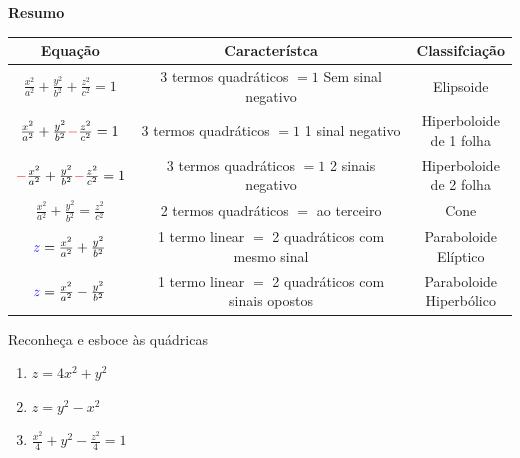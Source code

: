 \begin{center}

\textbf{Resumo}

\begin{tabular}{|c|c|c|}
	\hline
	Equação & Característca  & Classifciação    \\
	\hline
	\(\frac{x^2}{a^2}+\frac{y^2}{b^2}+\frac{z^2}{c^2}=1\) & \makecell{3 termos quadráticos \(=1\) \\ Sem sinal negativo } & Elipsoide \linebreak    \\
	\hline
	\(\frac{x^2}{a^2}+\frac{y^2}{b^2}{\color{red}-}\frac{z^2}{c^2}=1\)& \makecell{3 termos quadráticos \(=1\) \\ {\color{red}1 sinal negativo} }  & \makecell{Hiperboloide \\ de {\color{red}  1 folha} }    \\
	\hline
	\({\color{red}-}\frac{x^2}{a^2}+\frac{y^2}{b^2}{\color{red}-}\frac{z^2}{c^2}=1\) & \makecell{3 termos quadráticos \(=1\) \\ {\color{red} 2 sinais negativo} }  & \makecell{Hiperboloide \\ de {\color{red} 2 folha} }    \\
	\hline
	\( \frac{x^2}{a^2}+\frac{y^2}{b^2}=\frac{z^2}{c^2} \)& \makecell{2 termos quadráticos  \\ \(=\) ao terceiro }
	& Cone   \\
	\hline
	\( {\color{blue} z}=\frac{x^2}{a^2}+\frac{y^2}{b^2} \)& \makecell{{\color{blue} 1 termo linear} \(=\) 2
		quadráticos
		\\ com mesmo sinal }   & \makecell{{\color{blue} Paraboloide}\\ Elíptico}   \\
	\hline
	\(  {\color{blue} z}=\frac{x^2}{a^2}-\frac{y^2}{b^2} \)& \makecell{{\color{blue} 1 termo linear} \(=\) 2
		quadráticos
		\\ com {\color{red} sinais opostos} }   & \makecell{ {\color{blue} Paraboloide}\\  {\color{red} Hiperbólico}}   \\
	\hline
\end{tabular}
\end{center}


\begin{exeb}{}{}
	Reconheça e esboce às quádricas
	\begin{enumerate}
		\item \(z=4x^2+y^2\)
		\item \(z=y^2-x^2\)
		\item \(\displaystyle\frac{x^2}{4}+y^2-\frac{z^2}{4}=1\)
	\end{enumerate}
\end{exeb}

